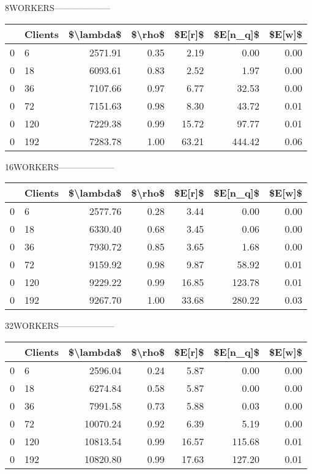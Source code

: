 8WORKERS--------------------
\begin{tabular}{llrrrrr}
\toprule
{} & Clients &  \$\textbackslash lambda\$ &  \$\textbackslash rho\$ &  \$E[r]\$ &  \$E[n\_q]\$ &  \$E[w]\$ \\
\midrule
0 &       6 &    2571.91 &    0.35 &    2.19 &      0.00 &    0.00 \\
0 &      18 &    6093.61 &    0.83 &    2.52 &      1.97 &    0.00 \\
0 &      36 &    7107.66 &    0.97 &    6.77 &     32.53 &    0.00 \\
0 &      72 &    7151.63 &    0.98 &    8.30 &     43.72 &    0.01 \\
0 &     120 &    7229.38 &    0.99 &   15.72 &     97.77 &    0.01 \\
0 &     192 &    7283.78 &    1.00 &   63.21 &    444.42 &    0.06 \\
\bottomrule
\end{tabular}
16WORKERS--------------------
\begin{tabular}{llrrrrr}
\toprule
{} & Clients &  \$\textbackslash lambda\$ &  \$\textbackslash rho\$ &  \$E[r]\$ &  \$E[n\_q]\$ &  \$E[w]\$ \\
\midrule
0 &       6 &    2577.76 &    0.28 &    3.44 &      0.00 &    0.00 \\
0 &      18 &    6330.40 &    0.68 &    3.45 &      0.06 &    0.00 \\
0 &      36 &    7930.72 &    0.85 &    3.65 &      1.68 &    0.00 \\
0 &      72 &    9159.92 &    0.98 &    9.87 &     58.92 &    0.01 \\
0 &     120 &    9229.22 &    0.99 &   16.85 &    123.78 &    0.01 \\
0 &     192 &    9267.70 &    1.00 &   33.68 &    280.22 &    0.03 \\
\bottomrule
\end{tabular}
32WORKERS--------------------
\begin{tabular}{llrrrrr}
\toprule
{} & Clients &  \$\textbackslash lambda\$ &  \$\textbackslash rho\$ &  \$E[r]\$ &  \$E[n\_q]\$ &  \$E[w]\$ \\
\midrule
0 &       6 &    2596.04 &    0.24 &    5.87 &      0.00 &    0.00 \\
0 &      18 &    6274.84 &    0.58 &    5.87 &      0.00 &    0.00 \\
0 &      36 &    7991.58 &    0.73 &    5.88 &      0.03 &    0.00 \\
0 &      72 &   10070.24 &    0.92 &    6.39 &      5.19 &    0.00 \\
0 &     120 &   10813.54 &    0.99 &   16.57 &    115.68 &    0.01 \\
0 &     192 &   10820.80 &    0.99 &   17.63 &    127.20 &    0.01 \\
\bottomrule
\end{tabular}

